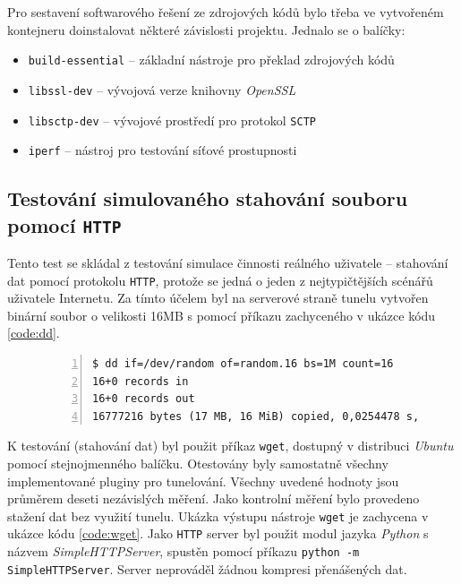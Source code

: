 \documentclass[thesis=M,czech]{FITthesis}[2012/10/20]
\begin{document}
Pro sestavení softwarového řešení ze zdrojových kódů bylo třeba ve vytvořeném kontejneru doinstalovat některé závislosti projektu. Jednalo se o balíčky:
\begin{itemize}
 \item \texttt{build-essential} -- základní nástroje pro překlad zdrojových kódů
 \item \texttt{libssl-dev} -- vývojová verze knihovny \textit{OpenSSL}
 \item \texttt{libsctp-dev} -- vývojové prostředí pro protokol \texttt{SCTP}
 \item \texttt{iperf} -- nástroj pro testování síťové prostupnosti
\end{itemize}


\subsection{Testování simulovaného stahování souboru pomocí \texttt{HTTP}}

Tento test se skládal z testování simulace činnosti reálného uživatele -- stahování dat pomocí protokolu \texttt{HTTP}, protože se jedná o jeden z nejtypičtějších scénářů uživatele Internetu. Za tímto účelem byl na serverové straně tunelu vytvořen binární soubor o velikosti 16MB s pomocí příkazu zachyceného v ukázce kódu \ref{code:dd}.


    \begin{figure}[h]
	\begin{lstlisting}[label=code:dd,caption=Vytvoření souboru binárních dat za účelem testování přenosu pomocí \texttt{HTTP},frame=single,numbers=left]
$ dd if=/dev/random of=random.16 bs=1M count=16
16+0 records in
16+0 records out
16777216 bytes (17 MB, 16 MiB) copied, 0,0254478 s, 659 MB/s
      \end{lstlisting}
    \end{figure}

    K testování (stahování dat) byl použit příkaz \texttt{wget}, dostupný v distribuci \textit{Ubuntu} pomocí stejnojmenného balíčku. Otestovány byly samostatně všechny implementované pluginy pro tunelování. Všechny uvedené hodnoty jsou průměrem deseti nezávislých měření. Jako kontrolní měření bylo provedeno stažení dat bez využití tunelu. Ukázka výstupu nástroje \texttt{wget} je zachycena v ukázce kódu \ref{code:wget}. Jako \texttt{HTTP} server byl použit modul jazyka \textit{Python} s názvem \textit{SimpleHTTPServer}, spustěn pomocí příkazu \texttt{python -m SimpleHTTPServer}. Server neprováděl žádnou kompresi přenášených dat.
    
\end{document}

